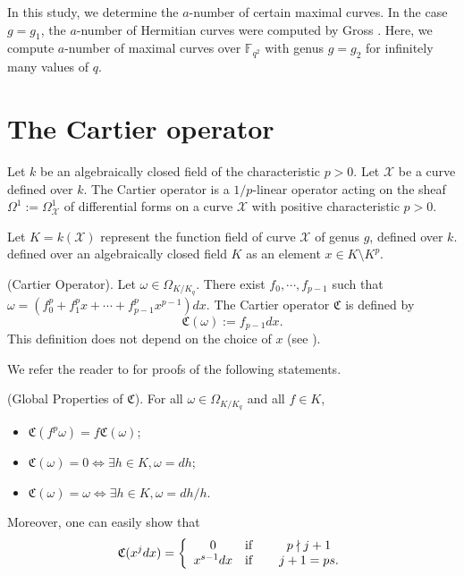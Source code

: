 In this study, we determine the $a$-number of certain maximal curves. In the case $g=g_1$, the $a$-number of Hermitian curves were computed by Gross \cite{10}.  Here, we compute $a$-number of maximal curves over $\mathbb{F}_{q^2}$  with genus $g=g_2$  for infinitely many values of $q$.


\section{The Cartier operator}
Let $k$ be an algebraically closed field of the characteristic $p>0$.
Let $\mathcal{X}$ be a
curve defined over $k$.
The Cartier operator is a $1/p$-linear operator acting on the sheaf $\Omega^1:=\Omega^1_{\mathcal{X}}$ of differential forms on a curve $\mathcal{X}$ with positive characteristic $p>0$.

 Let $K=k(\mathcal{X})$ represent the function field of curve $\mathcal{X}$ of genus $g$, defined over  $k$. defined over an algebraically closed field $K$ as an element $x \in K \setminus K^p$.

\begin{definition}
  (Cartier Operator). Let $\omega \in  \Omega_{K/K_q}$. There exist $f_0,\cdots, f_{p-1}$ such
that $\omega = (f^p_0 + f^p_1x +\cdots + f^p_{p-1}x^{p-1})dx$. The Cartier operator $\mathfrak{C}$ is defined by
$$\mathfrak{C}(\omega) := f_{p-1}dx.$$
This definition does not depend on the choice of $x$ (see \cite[Proposition 1]{100}).
\end{definition}
We refer the reader to \cite{100,30,40,150} for proofs of the following statements.

\begin{proposition}
  (Global Properties of $\mathfrak{C}$). For all $\omega \in  \Omega_{K/K_q}$ and all $f \in K$,

  \begin{itemize}
    \item $\mathfrak{C}(f^p\omega) = f\mathfrak{C}(\omega)$;
    \item $\mathfrak{C}(\omega) = 0 \Leftrightarrow \exists h \in K, \omega = dh$;
    \item $\mathfrak{C}(\omega) = \omega \Leftrightarrow \exists h \in K, \omega = dh/h$.
  \end{itemize}
\end{proposition}

\begin{remark}\label{remark}
\rm{ Moreover, one can easily show
that
\begin{equation*}
\mathfrak{C}(x^j dx) = \left\{
\begin{array}{ccc}
    0 & \mbox{if}&  \hspace{.4cm} p \nmid j+1  \\
    x^{s-1}dx & \mbox{if} &  \hspace{.4cm} j+1=ps.
\end{array} \right.
\end{equation*}}

\end{remark}



